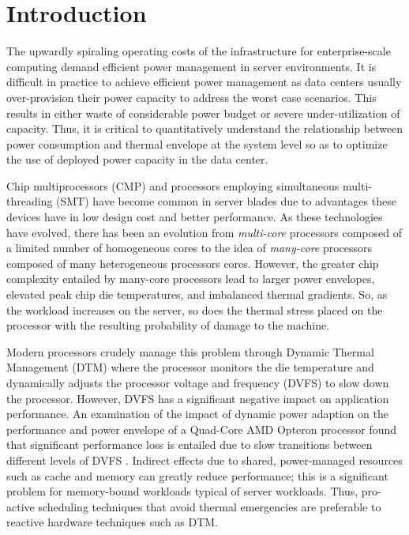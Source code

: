 %
%
\chapter{Introduction}
\label{sec:Introduction}
The upwardly spiraling operating costs of the infrastructure
for enterprise-scale computing demand efficient power management in
server environments. It is difficult in practice to achieve efficient
power management as data centers usually over-provision their power
capacity to address the worst case scenarios. This results in either waste
of considerable power budget or severe under-utilization of capacity.
Thus, it is critical to quantitatively understand the relationship
between power consumption and thermal envelope at the system level so as to
optimize the use of deployed power capacity in the data center.

Chip multiprocessors (CMP) and processors employing simultaneous
multi-threading (SMT) have become common in server blades due to
advantages these devices have in low design cost and better performance.
As these technologies have evolved, there has been an evolution from
\textit{multi-core} processors composed of a limited number of
homogeneous cores to the idea of \textit{many-core} processors composed
of many heterogeneous processors cores.  However, the greater chip
complexity entailed by many-core processors lead to larger power
envelopes, elevated peak chip die temperatures, and imbalanced thermal
gradients.  So, as the workload increases on the server, so does the
thermal stress placed on the processor with the resulting probability of
damage to the machine.

Modern processors crudely manage this problem through Dynamic Thermal
Management (DTM) where the processor monitors the die temperature and
dynamically adjusts the processor voltage and frequency (DVFS) to slow
down the processor.  However, DVFS has a significant negative impact on
application performance. An examination of the impact of dynamic power
adaption on the performance and power envelope of a Quad-Core AMD
Opteron processor found that significant performance loss is entailed
due to slow transitions between different levels of DVFS
\cite{Bircher2008}. Indirect effects due to shared, power-managed
resources such as cache and memory can greatly reduce performance; this
is a significant problem for memory-bound workloads typical of server
workloads. Thus, pro-active scheduling techniques that avoid thermal
emergencies are preferable to reactive hardware techniques such as DTM.

